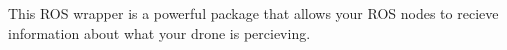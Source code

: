 This R\+OS wrapper is a powerful package that allows your R\+OS nodes to recieve information about what your drone is percieving. 